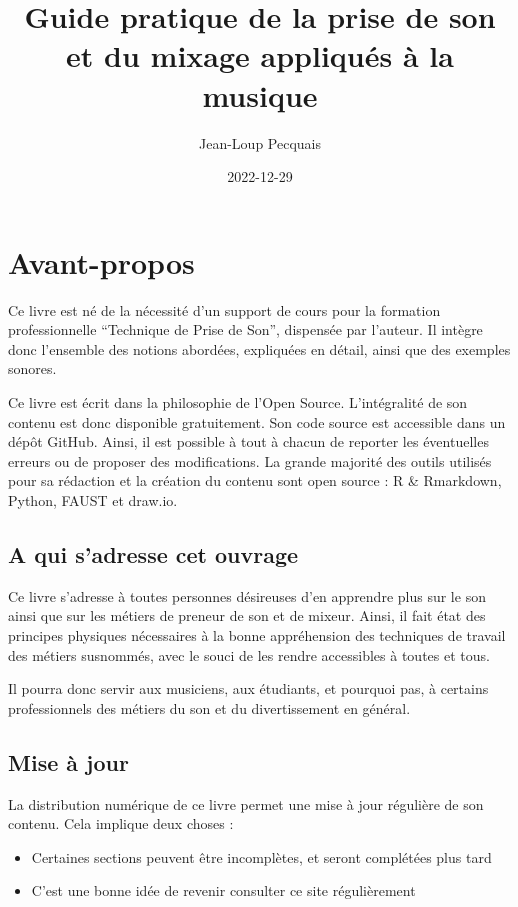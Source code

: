 \documentclass[
]{book}
\title{Guide pratique de la prise de son et du mixage appliqués à la musique}
\author{Jean-Loup Pecquais}
\date{2022-12-29}
\providecommand{\tightlist}{%
  \setlength{\itemsep}{0pt}\setlength{\parskip}{0pt}}
\begin{document}
\maketitle

{
\setcounter{tocdepth}{1}
\tableofcontents
}
\hypertarget{avant-propos}{%
\chapter{Avant-propos}\label{avant-propos}}

Ce livre est né de la nécessité d'un support de cours pour la formation professionnelle ``Technique de Prise de Son'', dispensée par l'auteur. Il intègre donc l'ensemble des notions abordées, expliquées en détail, ainsi que des exemples sonores.

Ce livre est écrit dans la philosophie de l'Open Source. L'intégralité de son contenu est donc disponible gratuitement. Son code source est accessible dans un dépôt GitHub. Ainsi, il est possible à tout à chacun de reporter les éventuelles erreurs ou de proposer des modifications. La grande majorité des outils utilisés pour sa rédaction et la création du contenu sont open source : R \& Rmarkdown, Python, FAUST et draw.io.

\hypertarget{a-qui-sadresse-cet-ouvrage}{%
\section{A qui s'adresse cet ouvrage}\label{a-qui-sadresse-cet-ouvrage}}

Ce livre s'adresse à toutes personnes désireuses d'en apprendre plus sur le son ainsi que sur les métiers de preneur de son et de mixeur. Ainsi, il fait état des principes physiques nécessaires à la bonne appréhension des techniques de travail des métiers susnommés, avec le souci de les rendre accessibles à toutes et tous.

Il pourra donc servir aux musiciens, aux étudiants, et pourquoi pas, à certains professionnels des métiers du son et du divertissement en général.

\hypertarget{mise-uxe0-jour}{%
\section{Mise à jour}\label{mise-uxe0-jour}}

La distribution numérique de ce livre permet une mise à jour régulière de son contenu. Cela implique deux choses :

\begin{itemize}
\tightlist
\item
  Certaines sections peuvent être incomplètes, et seront complétées plus tard
\item
  C'est une bonne idée de revenir consulter ce site régulièrement
\end{itemize}
\end{document}
